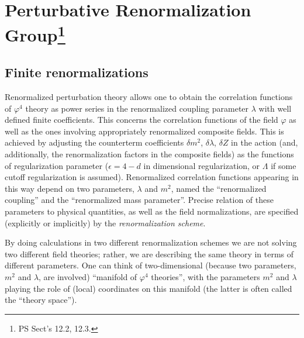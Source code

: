 \section[Perturbative Renormalization Group]{Perturbative Renormalization Group\protect\footnote{PS Sect's 12.2, 12.3.}}

\subsection*{Finite renormalizations}

Renormalized perturbation theory allows one to obtain the correlation functions
of $\varphi^4$ theory as power series in the renormalized coupling parameter
$\lambda$ with well defined finite coefficients. This concerns the correlation
functions of the field $\varphi$ as well as the ones involving appropriately
renormalized composite fields. This is achieved by adjusting the counterterm
coefficients $\delta m^2$, $\delta\lambda$, $\delta Z$ in the action (and,
additionally, the renormalization factors in the composite fields) as the
functions of regularization parameter ($\epsilon=4-d$ in dimensional
regularization, or $\Lambda$ if some cutoff regularization is assumed).
Renormalized correlation functions appearing in this way depend on two
parameters, $\lambda$ and $m^2$, named the ``renormalized coupling'' and the
``renormalized mass parameter''. Precise relation of these parameters to
physical quantities, as well as the field normalizations, are specified
(explicitly or implicitly) by the \emph{renormalization scheme}.

By doing calculations in two different renormalization schemes we are not
solving two different field theories; rather, we are describing the same theory
in terms of different parameters. One can think of two-dimensional (because two
parameters, $m^2$ and $\lambda$, are involved) ``manifold of $\varphi^4$
theories'', with the parameters $m^2$ and $\lambda$ playing the role of (local)
coordinates on this manifold (the latter is often called the ``theory space'').


